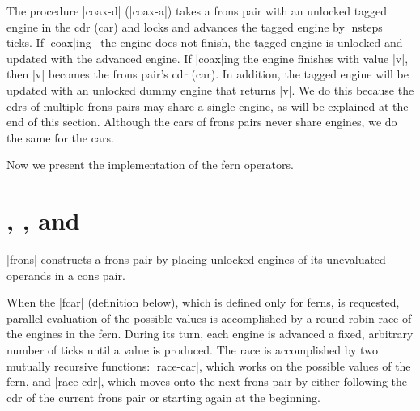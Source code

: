 \schemedisplayspace
{}

\wspace

The procedure \scheme|coax-d| (\scheme|coax-a|) takes a frons pair
with an unlocked tagged engine in the cdr (car) and locks and advances
the tagged engine by \scheme|nsteps| ticks. If
\scheme|coax|ing~\cite{Friedman79b} the engine does not finish, the
tagged engine is unlocked and updated with the advanced engine. If
\scheme|coax|ing the engine finishes with value \scheme|v|, then
\scheme|v| becomes the frons pair's cdr (car). In addition, the tagged
engine will be updated with an unlocked dummy engine that returns
\scheme|v|. We do this because the cdrs of multiple frons pairs may
share a single engine, as will be explained at the end of this
section.  Although the cars of frons pairs never share engines, we do
the same for the cars.

\schemedisplayspace
{}

\wspace

\noindent
Now we present the implementation of the fern operators.


\section{\fronssymbol, \fcarsymbol, and \fcdrsymbol}\label{frons}\label{car}\label{cdr}\label{fronsconstructorsection}

\scheme|frons| constructs a frons pair by placing unlocked engines of
its unevaluated operands in a cons pair.

\schemedisplayspace
{}


\wspace

\noindent
When the \scheme|fcar| (definition below), which is defined only for
ferns, is requested, parallel evaluation of the possible values is
accomplished by a round-robin race of the engines in the
fern.  During its turn, each engine is advanced a fixed,
arbitrary number of ticks until a value is produced.  The race is
accomplished by two mutually recursive functions: \scheme|race-car|,
which works on the possible values of the fern, and \scheme|race-cdr|,
which moves onto the next frons pair by either following the cdr of
the current frons pair or starting again at the beginning.

